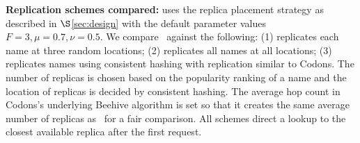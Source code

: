{\textbf{Replication schemes compared:}}
\textbf{\auspice} uses the replica placement strategy as described in $\S$\ref{sec:design} with the default parameter values $F=3, \mu = 0.7, \nu = 0.5$. %
We compare \auspice\ against the following: (1) \textbf{\staticthree} replicates each name at three random locations; (2) \textbf{\replicateall} replicates all names at all locations; (3) \textbf{\codons} replicates names using consistent hashing with replication similar to Codons\cite{codons-paper}. The number of replicas is chosen based on the popularity ranking of a name and  the location of replicas is decided by consistent hashing. The average hop count in Codons's underlying Beehive algorithm  is set so that it creates the same average number of replicas as \auspice\ for a fair comparison. All schemes direct a lookup to the closest available replica after the first request.



